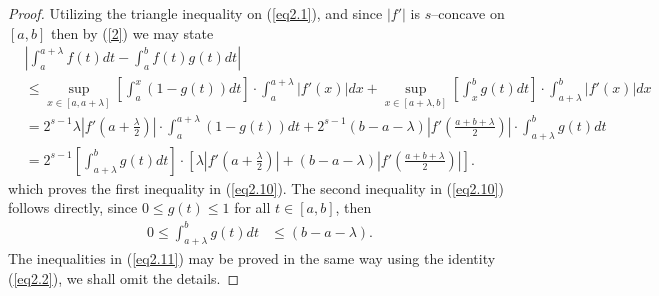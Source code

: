 \documentclass{amsart}
\theoremstyle{plain}
\numberwithin{equation}{section}
\begin{document}
\begin{proof}
Utilizing the triangle inequality on (\ref{eq2.1}), and since
$|f'|$ is $s$--concave on $[a,b]$ then by (\ref{2}) we may state
\begin{align*}
&\left| {\int_a^{a + \lambda } {f\left( t \right)dt}  - \int_a^b
{f\left( t \right)g\left( t \right)dt} } \right|
\\
&\le \mathop {\sup }\limits_{x \in \left[ {a,a + \lambda }
\right]} \left[ {\int_a^x {\left( {1 - g\left( t \right)}
\right)dt} } \right] \cdot \int_a^{a + \lambda } \left|
f'\left(x\right) \right|dx + \mathop {\sup }\limits_{x \in \left[
{a + \lambda ,b} \right]} \left[ {\int_x^b {g\left( t \right)dt} }
\right] \cdot \int_{a + \lambda }^b
\left|f'\left(x\right)\right|dx
\\
&= 2^{s-1}\lambda\left| {f'\left( {a + \frac{\lambda }{2}}
\right)} \right|\cdot \int_a^{a + \lambda } {\left( {1 - g\left( t
\right)} \right)dt} + 2^{s-1} \left( {b - a - \lambda } \right)
\left| {f'\left( {\frac{{a + b + \lambda }}{2}} \right)} \right|
 \cdot \int_{a + \lambda }^b {g\left( t \right)dt}
\\
&= 2^{s-1}\left[ \int_{a + \lambda }^b {g\left( t \right)dt}
\right]\cdot \left[ {\lambda\left| {f'\left( {a + \frac{\lambda
}{2}} \right)} \right| + \left( {b - a - \lambda} \right)\left|
{f'\left( {\frac{{a + b + \lambda }}{2}} \right)} \right|}
\right].
\end{align*}
which proves the first inequality in (\ref{eq2.10}). The second
inequality in (\ref{eq2.10}) follows directly, since $0 \le g(t)
\le 1$ for all $t \in [a,b]$, then
\begin{align*}
0 \le \int_{a + \lambda }^b {g\left( t \right)dt} &\le \left( {b -
a - \lambda } \right).
\end{align*}
The inequalities in (\ref{eq2.11}) may be proved in the same way
using the identity (\ref{eq2.2}), we shall omit the details.
\end{proof}
\end{document}
